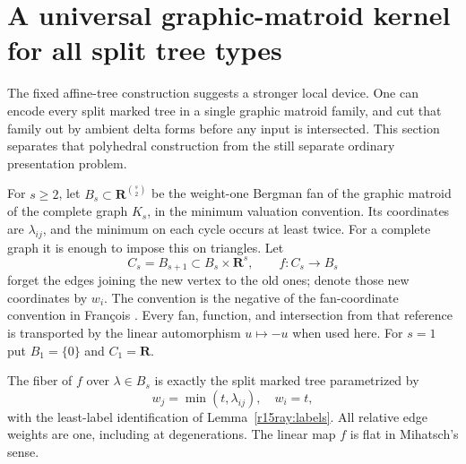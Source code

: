 \section{A universal graphic-matroid kernel for all split tree types}
\label{r15ug:section}

The fixed affine-tree construction suggests a stronger local device.
One can encode every split marked tree in a single graphic matroid
family, and cut that family out by ambient delta forms before any
input is intersected. This section separates that polyhedral
construction from the still separate ordinary presentation problem.

\begin{definition}
\label{r15ug:fans}
For $s\geq2$, let $B_s\subset\mathbf R^{\binom s2}$ be the
weight-one Bergman fan of the graphic matroid of the complete graph
$K_s$, in the minimum valuation convention. Its coordinates are
$\lambda_{ij}$, and the minimum on each cycle occurs at least twice.
For a complete graph it is enough to impose this on triangles.
Let
\[
 C_s=B_{s+1}\subset B_s\times\mathbf R^s,
       \qquad f:C_s\longrightarrow B_s
\tag{UG15.1}\label{r15ug:universal}
\]
forget the edges joining the new vertex to the old ones; denote
those new coordinates by $w_i$. The convention is the negative
of the fan-coordinate convention in Fran\c{c}ois \cite{Francois}.
Every fan, function, and intersection from that reference is
transported by the linear automorphism $u\mapsto-u$ when used here.
For $s=1$ put $B_1=\{0\}$ and $C_1=\mathbf R$.
\end{definition}

\begin{lemma}
\label{r15ug:flat}
The fiber of $f$ over $\lambda\in B_s$ is exactly the split
marked tree parametrized by
\[
          w_j=\min(t,\lambda_{ij}),\quad w_i=t,
\tag{UG15.2}\label{r15ug:rays}
\]
with the least-label identification of Lemma~\ref{r15ray:labels}.
All relative edge weights are one, including at degenerations.
The linear map $f$ is flat in Mihatsch's sense.
\end{lemma}

